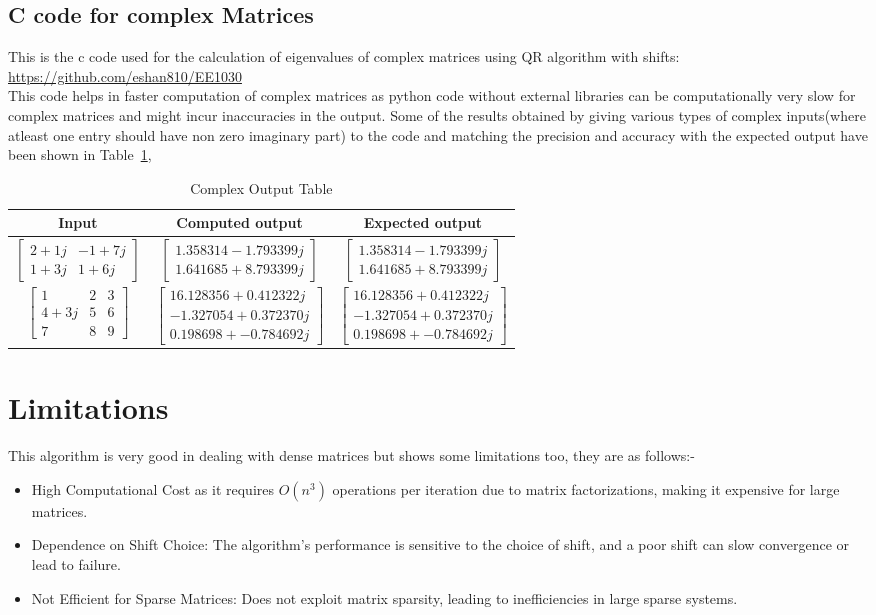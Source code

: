 \documentclass[12pt]{article}
\newcommand{\myvec}[1]{\begin{bmatrix} #1 \end{bmatrix}}
\begin{document}
\subsection{C code for complex Matrices}
This is the c code used for the calculation of eigenvalues of complex matrices using QR algorithm with shifts: \\
\url{https://github.com/eshan810/EE1030}\\
This code helps in faster computation of complex matrices as python code without external libraries can be computationally very slow for complex matrices and might incur inaccuracies in the output.
Some of the results obtained by giving various types of complex inputs(where atleast one entry should have non zero imaginary part) to the code and matching the precision and accuracy with the expected output have been shown in Table~\ref{Table 2},
\begin{table}[H]
\centering
\begin{tabular}{|c|c|c|}
\hline
\textbf{Input} & \textbf{Computed output} & \textbf{Expected output} \\
\hline
$\myvec{2 + 1j & -1 + 7j\\1 + 3j&1 + 6j}$ & $\myvec{1.358314 - 1.793399j\\ 1.641685 + 8.793399j}$ & $\myvec{1.358314 - 1.793399j\\ 1.641685 + 8.793399j}$ \\ \hline
$\myvec{1&2&3\\4 + 3j&5&6\\7&8&9}$ & $\myvec{16.128356 + 0.412322j\\ -1.327054 + 0.372370j\\ 0.198698 + -0.784692j}$ & $\myvec{16.128356 + 0.412322j\\ -1.327054 + 0.372370j\\ 0.198698 + -0.784692j}$ \\ \hline
\end{tabular}
\caption{Complex Output Table}
\label{Table 2}
\end{table}
\section{Limitations}
This algorithm is very good in dealing with dense  matrices but shows some limitations too, they are as follows:-
\begin{itemize}
    \item High Computational Cost as it requires $O(n^3)$ operations per iteration due to matrix factorizations, making it expensive for large matrices.
    \item Dependence on Shift Choice: The algorithm's performance is sensitive to the choice of shift, and a poor shift can slow convergence or lead to failure.
    \item Not Efficient for Sparse Matrices: Does not exploit matrix sparsity, leading to inefficiencies in large sparse systems.
\end{itemize}
\end{document}
